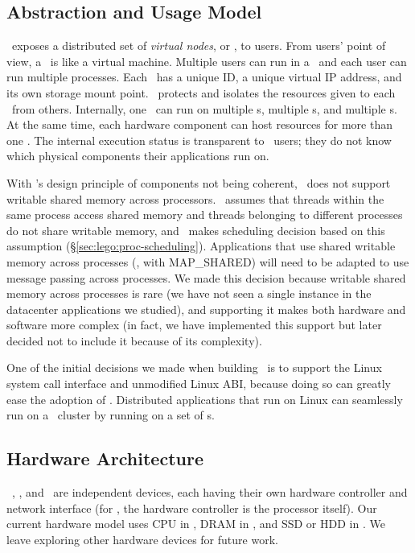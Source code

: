 \subsection{Abstraction and Usage Model}
\lego\ exposes a distributed set of {\em virtual nodes}, or {\em \vnode}, to users.
From users' point of view, a \vnode\ is like a virtual machine. 
Multiple users can run in a \vnode\ and each user can run multiple processes.
Each \vnode\ has a unique ID, a unique virtual IP address, %
and its own storage mount point. %
\lego\ protects and isolates the resources given to each \vnode\ from others.
Internally, one \vnode\ can run on multiple \pcomponent{}s, multiple \mcomponent{}s,
and multiple \scomponent{}s.
At the same time, each hardware component can host resources for more than one \vnode.
The internal execution status is transparent to \lego\ users;
they do not know which physical components their applications run on.

With \splitkernel's design principle of components not being coherent,
\lego\ does not support writable shared memory across processors. %
\lego\ assumes that threads within the same process access shared memory
and threads belonging to different processes do not share writable memory,
and \lego\ makes scheduling decision based on this assumption (\S\ref{sec:lego:proc-scheduling}).
Applications that use shared writable memory across processes (\eg, with MAP\_SHARED)
will need to be adapted to use message passing across processes.
We made this decision because writable shared memory across processes is rare 
(we have not seen a single instance in the datacenter applications we studied),
and supporting it makes both hardware and software more complex 
(in fact, we have implemented this support but later decided not to include it because of its complexity).

One of the initial decisions we made when building \lego\ is to support the Linux system call interface 
and unmodified Linux ABI,
because doing so can greatly ease the adoption of \lego.
Distributed applications that run on Linux can seamlessly run on a \lego\ cluster
by running on a set of \vnode{}s. %

\subsection{Hardware Architecture}
\label{sec:lego:hardware}

\lego\ \pcomponent, \mcomponent, and \scomponent\ are independent devices,
each having their own hardware controller and network interface (for \pcomponent, the hardware controller is the processor itself).
Our current hardware model uses CPU in \pcomponent, 
DRAM in \mcomponent, and SSD or HDD in \scomponent.
We leave exploring other hardware devices for future work.

